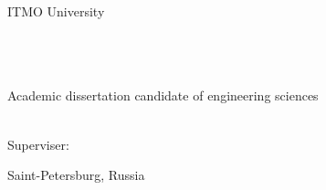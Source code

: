 \thispagestyle{empty}


\vspace{0pt plus2fill} %
\begin{center}
	ITMO University
\end{center}

\vspace*{150pt}
\begin{center}
\textbf {\large
	\PhDStudent
} \\
\vspace*{6pt}
\textbf{{\huge 
	\ThesisName
}} \\
\vspace*{6pt}
\MySpeciality \\
\vspace*{6pt}
Academic dissertation candidate of engineering sciences \\ \ \\ 
\vspace*{60pt}
\begin{flushright}
	Superviser:\\ \MySuperviser
\end{flushright}
\end{center}

\vspace{0pt plus2fill} %

\begin{center}
	Saint-Petersburg, Russia\\
	\the\year{}%
\end{center}


